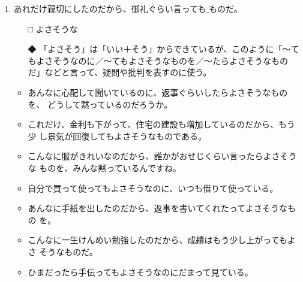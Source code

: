 \documentclass[
uplatex,
b5paper,
10pt,
dvipdfmx
]{jsbook}
\begin{document}
\begin{enumerate}
\item あれだけ親切にしたのだから、御礼ぐらい言っても\underline{    }ものだ。 
\begin{itemize}
\item[□] よさそうな
\item[◆] 「よさそう」は「いい＋そう」からできているが、このように「〜て
	  もよさそうなのに／〜てもよさそうなものを／〜たらよさそうなもの
	  だ」などと言って、疑問や批判を表すのに使う。
\end{itemize}
\begin{itemize}
\item あんなに心配して聞いているのに、返事ぐらいしたらよさそうなものを、
      どうして黙っているのだろうか。
\item これだけ、金利も下がって、住宅の建設も増加しているのだから、もう少
      し景気が回復してもよさそうなものである。
\item こんなに服がきれいなのだから、誰かがおせじくらい言ったらよさそうな
      ものを、みんな黙っているんですね。
\item 自分で買って使ってもよさそうなのに、いつも借りて使っている。
\item あんなに手紙を出したのだから、返事を書いてくれたってよさそうなもの
      を。
\item こんなに一生けんめい勉強したのだから、成績はもう少し上がってもよさ
      そうなものだ。
\item ひまだったら手伝ってもよさそうなのにだまって見ている。
\end{itemize}


\end{enumerate}
\end{document}
